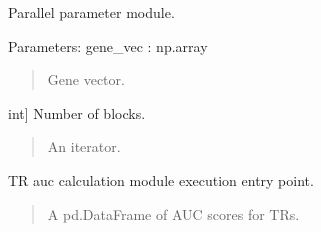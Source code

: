 \documentclass[letterpaper,10pt,english]{sphinxmanual}
\begin{document}
\begin{fulllineitems}
\begin{fulllineitems}
\begin{quote}
\begin{description}
\end{description}\end{quote}

\end{fulllineitems}


\begin{fulllineitems}
\label{\detokenize{index:TRAPT.CalcTRAUC.CalcTRAUC.iter_params}}
\pysigstartsignatures
{}
\pysigstopsignatures
\sphinxAtStartPar
Parallel parameter module.

\sphinxAtStartPar
Parameters:
gene\_vec : np.array
\begin{quote}

\sphinxAtStartPar
Gene vector.
\end{quote}
\begin{description}
\sphinxlineitem{trunk}{[}int{]}
\sphinxAtStartPar
Number of blocks.

\end{description}
\begin{quote}\begin{description}
\sphinxAtStartPar
An iterator.

\end{description}\end{quote}

\end{fulllineitems}


\begin{fulllineitems}
\label{\detokenize{index:TRAPT.CalcTRAUC.CalcTRAUC.run}}
\pysigstartsignatures
{}
\pysigstopsignatures
\sphinxAtStartPar
TR auc calculation module execution entry point.
\begin{quote}\begin{description}
\sphinxAtStartPar
A pd.DataFrame of AUC scores for TRs.

\end{description}\end{quote}

\end{fulllineitems}


\end{fulllineitems}
\end{document}
